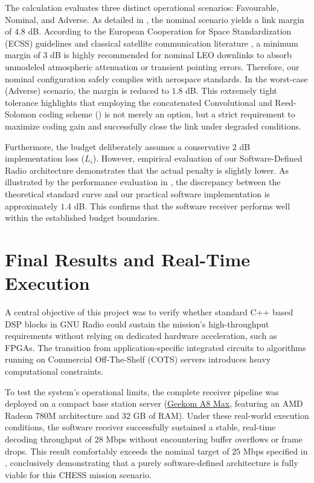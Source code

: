 The calculation evaluates three distinct operational scenarios: Favourable, Nominal, and Adverse. As detailed in , the nominal scenario yields a link margin of $4.8$ dB. According to the European Cooperation for Space Standardization (ECSS) guidelines and classical satellite communication literature \autocite{Maral2009}, a minimum margin of $3$ dB is highly recommended for nominal LEO downlinks to absorb unmodeled atmospheric attenuation or transient pointing errors. Therefore, our nominal configuration safely complies with aerospace standards. In the worst-case (Adverse) scenario, the margin is reduced to $1.8$ dB. This extremely tight tolerance highlights that employing the concatenated Convolutional and Reed-Solomon coding scheme () is not merely an option, but a strict requirement to maximize coding gain and successfully close the link under degraded conditions.

Furthermore, the budget deliberately assumes a conservative $2$ dB implementation loss ($L_i$). However, empirical evaluation of our Software-Defined Radio architecture demonstrates that the actual penalty is slightly lower. As illustrated by the performance evaluation in , the discrepancy between the theoretical standard curve and our practical software implementation is approximately $1.4$ dB. This confirms that the software receiver performs well within the established budget boundaries.

\section{Final Results and Real-Time Execution}

A central objective of this project was to verify whether standard C++ based DSP blocks in GNU Radio could sustain the mission's high-throughput requirements without relying on dedicated hardware acceleration, such as FPGAs. The transition from application-specific integrated circuits to algorithms running on Commercial Off-The-Shelf (COTS) servers introduces heavy computational constraints.

To test the system's operational limits, the complete receiver pipeline was deployed on a compact base station server (\href{https://www.galaxus.ch/fr/s1/product/geekom-a8-max-1000-go-32-go-radeon-780m-pc-58778517}{Geekom A8 Max}, featuring an AMD Radeon 780M architecture and 32 GB of RAM). Under these real-world execution conditions, the software receiver successfully sustained a stable, real-time decoding throughput of $28$ Mbps without encountering buffer overflows or frame drops. This result comfortably exceeds the nominal target of $25$ Mbps specified in , conclusively demonstrating that a purely software-defined architecture is fully viable for this \textsf{CHESS} mission scenario.

